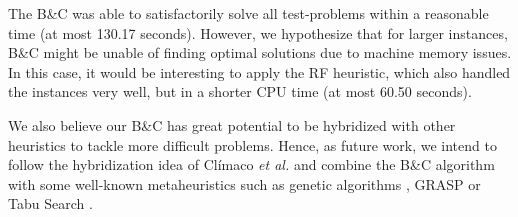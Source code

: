 \documentclass{ro}
\begin{document}


The  B\&C was able to satisfactorily solve all test-problems within a reasonable time (at most 130.17 seconds). However,  we hypothesize that for larger instances, B\&C might  be unable of finding optimal solutions due to machine memory issues. In this case, it would be interesting to apply the RF heuristic, which also handled the instances very well, but in a shorter CPU time (at most 60.50 seconds).

We also believe our B\&C has great potential to be hybridized with other heuristics to tackle more difficult problems. Hence, as future work, we intend to follow the hybridization idea of Cl\'imaco \textit{et al.}\cite{climaco2018} and combine the B\&C algorithm with some well-known metaheuristics such as genetic algorithms \cite{kramer2017genetic}, GRASP \cite{resende2016optimization} or Tabu Search \cite{laguna2018tabu}.






\end{document}
